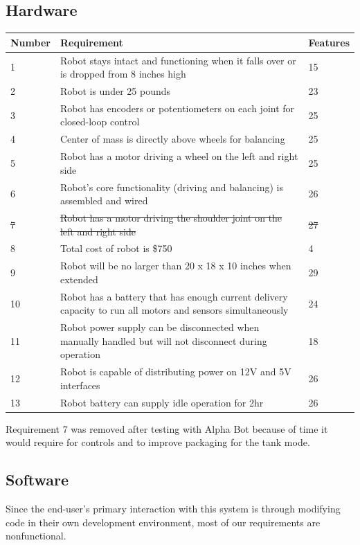 \documentclass{fank1basedocument}
\begin{document}
\subsection*{Hardware}
\begin{center}
	\begin{tabular}{|p{}|p{}|p{}|}
		\hline
		\textbf{Number} & \textbf{Requirement} & \textbf{Features}\\
		\hline
		1 & Robot stays intact and functioning when it falls over or is dropped from 8 inches high & 15\\
		\hline
		2 & Robot is under 25 pounds & 23\\
		\hline
		3 & Robot has encoders or potentiometers on each joint for closed-loop control & 25\\
		\hline
		4 & Center of mass is directly above wheels for balancing & 25\\
		\hline
		5 & Robot has a motor driving a wheel on the left and right side & 25\\
		\hline
		6 & Robot’s core functionality (driving and balancing) is assembled and wired & 26\\
		\hline
		\sout{7} & \sout{Robot has a motor driving the shoulder joint on the left and right side} & \sout{27}\\
		\hline
		8 & Total cost of robot is \$750 & 4\\
		\hline
		9 & Robot will be no larger than 20 x 18 x 10 inches when extended & 29\\
		\hline
		10 & Robot has a battery that has enough current delivery capacity to run all motors and sensors simultaneously & 24\\
		\hline
		11 & Robot power supply can be disconnected when manually handled but will not disconnect during operation & 18\\
		\hline
		12 & Robot is capable of distributing power on 12V and 5V interfaces & 26\\
		\hline
		13 & Robot battery can supply idle operation for 2hr & 26\\
		\hline
	\end{tabular}
\end{center}
Requirement 7 was removed after testing with Alpha Bot because of time it would require for controls and to improve packaging for the tank mode.

\subsection*{Software}
Since the end-user's primary interaction with this system is through modifying code in their own development environment, most of our requirements are nonfunctional.
\end{document}
